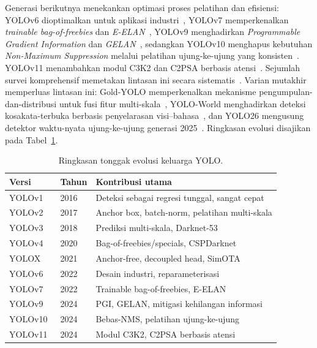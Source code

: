 \documentclass[11pt,a4paper]{article}
\begin{document}
Generasi berikutnya menekankan optimasi proses pelatihan dan efisiensi:
YOLOv6 dioptimalkan untuk aplikasi industri~\cite{li2022yolov6}, YOLOv7
memperkenalkan \emph{trainable bag-of-freebies} dan \emph{E-ELAN}~\cite{wang2023yolov7},
YOLOv9 menghadirkan \emph{Programmable Gradient Information} dan
\emph{GELAN}~\cite{wang2024yolov9}, sedangkan YOLOv10 menghapus kebutuhan
\emph{Non-Maximum Suppression} melalui pelatihan ujung-ke-ujung yang
konsisten~\cite{wang2024yolov10}. YOLOv11 menambahkan modul C3K2 dan C2PSA
berbasis atensi~\cite{khanam2024yolov11}. Sejumlah survei komprehensif memetakan
lintasan ini secara sistematis~\cite{terven2023yolo,hussain2023yolo,diwan2023yolo,
sapkota2024yoloagri,sapkota2025yologenesis,vijayakumar2024yolo,alif2024yoloevolution,
sohan2024yolov8review}. Varian mutakhir memperluas lintasan ini: Gold-YOLO
memperkenalkan mekanisme pengumpulan-dan-distribusi untuk fusi fitur
multi-skala~\cite{wang2023goldyolo}, YOLO-World menghadirkan deteksi
kosakata-terbuka berbasis penyelarasan visi--bahasa~\cite{cheng2024yoloworld},
dan YOLO26 mengusung detektor waktu-nyata ujung-ke-ujung generasi
2025~\cite{sapkota2025yolo26}. Ringkasan evolusi disajikan pada Tabel~\ref{tab:yolo}.

\begin{table}[htbp]
\centering
\caption{Ringkasan tonggak evolusi keluarga YOLO.}
\label{tab:yolo}
\small
\begin{tabular}{@{}llp{7.6cm}@{}}
\toprule
\textbf{Versi} & \textbf{Tahun} & \textbf{Kontribusi utama} \\
\midrule
YOLOv1~\cite{redmon2016yolo}      & 2016 & Deteksi sebagai regresi tunggal, sangat cepat \\
YOLOv2~\cite{redmon2017yolo9000}  & 2017 & Anchor box, batch-norm, pelatihan multi-skala \\
YOLOv3~\cite{redmon2018yolov3}    & 2018 & Prediksi multi-skala, Darknet-53 \\
YOLOv4~\cite{bochkovskiy2020yolov4} & 2020 & Bag-of-freebies/specials, CSPDarknet \\
YOLOX~\cite{ge2021yolox}          & 2021 & Anchor-free, decoupled head, SimOTA \\
YOLOv6~\cite{li2022yolov6}        & 2022 & Desain industri, reparameterisasi \\
YOLOv7~\cite{wang2023yolov7}      & 2022 & Trainable bag-of-freebies, E-ELAN \\
YOLOv9~\cite{wang2024yolov9}      & 2024 & PGI, GELAN, mitigasi kehilangan informasi \\
YOLOv10~\cite{wang2024yolov10}    & 2024 & Bebas-NMS, pelatihan ujung-ke-ujung \\
YOLOv11~\cite{khanam2024yolov11}  & 2024 & Modul C3K2, C2PSA berbasis atensi \\
\bottomrule
\end{tabular}
\end{table}
\end{document}
